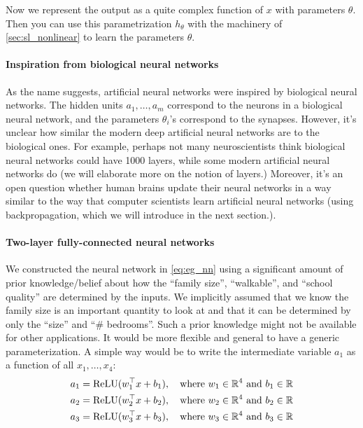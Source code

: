 Now we represent the output as a quite complex function of $x$ with
parameters $\theta$. Then you can use this parametrization $h_\theta$ with the machinery of
\cref{sec:sl_nonlinear} to learn the parameters $\theta$.


\paragraph{Inspiration from biological neural networks} As the name suggests,
artificial neural networks were inspired by biological neural networks. The
hidden units $a_1 ,\ldots,a_m$ correspond to the neurons in a biological neural network,
and the parameters $\theta_i$'s correspond to the synapses. However, it's
unclear how similar the modern deep artificial neural networks are to the
biological ones. For example, perhaps not many neuroscientists think biological
neural networks could have 1000 layers, while some modern artificial neural
networks do (we will elaborate more on the notion of layers.) Moreover, it's
an open question whether human brains update their neural networks in a
way similar to the way that computer scientists learn artificial neural
networks (using backpropagation, which we will introduce in the next section.).

\paragraph{Two-layer fully-connected neural networks} We constructed the
neural network in \cref{eq:eg_nn} using a significant amount of prior
knowledge/belief about how the ``family size'', ``walkable'', and ``school quality'' are
determined by the inputs. We implicitly assumed that we know the family
size is an important quantity to look at and that it can be determined by only
the ``size'' and ``\# bedrooms''. Such a prior knowledge might not be available
for other applications. It would be more flexible and general to have a generic
parameterization. A simple way would be to write the intermediate variable
$a_1$ as a function of all $x_1 ,\ldots,x_4$:
\begin{align*}
    a_1 &= \operatorname{ReLU}(w^\top_1 x + b_1 ),\quad \text{where } w_1 \in \mathbb{R}^4 \text{ and } b_1 \in \mathbb{R}\\
    a_2 &= \operatorname{ReLU}(w^\top_2 x + b_2 ),\quad \text{where } w_2 \in \mathbb{R}^4 \text{ and } b_2 \in \mathbb{R}\\
    a_3 &= \operatorname{ReLU}(w^\top_3 x + b_3 ),\quad \text{where } w_3 \in \mathbb{R}^4 \text{ and } b_3 \in \mathbb{R}
\end{align*}

